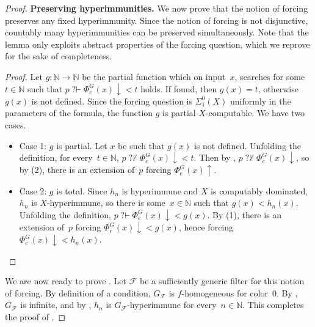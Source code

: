 \documentclass{article}
\def\F{\mathcal{F}}
\newcommand{\converge}{\!\!\downarrow}
\newcommand{\diverge}{\!\!\uparrow}
\newcommand{\qvdash}{\operatorname{{?}{\vdash}}}
\newcommand{\nqvdash}{\operatorname{{?}{\nvdash}}}
\newcommand{\NN}[0]{\mathbb{N}}
\numberwithin{theorem}{section}
\newtheorem{lemma}[theorem]{Lemma}
\begin{document}
\begin{proof}
\noindent
\textbf{Preserving hyperimmunities.}
We now prove that the notion of forcing preserves any fixed hyperimmunity. Since the notion of forcing is not disjunctive, countably many hyperimmunities can be preserved simultaneously. Note that the lemma only exploits abstract properties of the forcing question, which we reprove for the sake of completeness.

\begin{proof}
Let $g : \NN \to \NN$ be the partial function which on input~$x$, searches for some~$t \in \NN$ such that $p \qvdash \Phi_e^G(x)\converge < t$ holds. If found, then $g(x) = t$, otherwise $g(x)$ is not defined. Since the forcing question is $\Sigma^0_1(X)$ uniformly in the parameters of the formula, the function $g$ is partial $X$-computable. We have two cases.
\begin{itemize}
    \item Case 1: $g$ is partial. Let $x$ be such that $g(x)$ is not defined. Unfolding the definition, for every~$t \in \NN$, $p \nqvdash \Phi_e^G(x)\converge < t$. Then by , $p \nqvdash \Phi_e^G(x)\converge$, so by (2), there is an extension of~$p$ forcing $\Phi_e^G(x)\diverge$.
    \item Case 2: $g$ is total. Since $h_n$ is hyperimmune and $X$ is computably dominated, $h_n$ is $X$-hyperimmune, so there is some~$x \in \NN$ such that $g(x) < h_n(x)$. Unfolding the definition, $p \qvdash \Phi_e^G(x)\converge < g(x)$. By (1), there is an extension of~$p$ forcing $\Phi_e^G(x)\converge < g(x)$, hence forcing $\Phi_e^G(x)\converge < h_n(x)$.
\end{itemize}
\end{proof}
\bigskip

We are now ready to prove . Let $\F$ be a sufficiently generic filter for this notion of forcing. By definition of a condition, $G_\F$ is $f$-homogeneous for color~0.
By , $G_\F$ is infinite, and by , $h_n$ is $G_\F$-hyperimmune for every~$n \in \NN$. This completes the proof of .
\end{proof}
\end{document}
